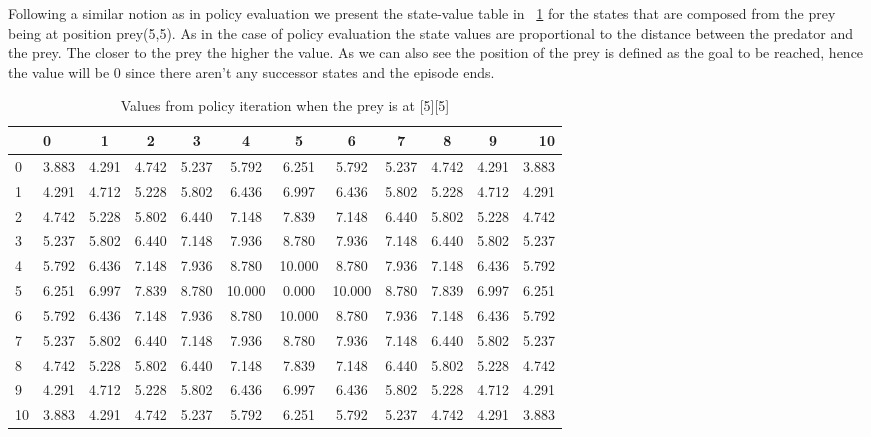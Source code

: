 \documentclass[paper=a4, fontsize=11pt]{scrartcl}
\numberwithin{equation}{section}		%
\numberwithin{figure}{section}			%
\numberwithin{table}{section}				%
\begin{document}
Following a similar notion as in policy evaluation we present the state-value table in ~\ref{pitS} for the states that are composed from the prey being at position prey(5,5). As in the case of policy evaluation the state values are proportional to the distance between the predator and the prey. The closer to the prey the higher the value. As we can also see the position of the prey is defined as the goal to be reached, hence the value will be 0 since there aren't any successor states and the episode ends.

\begin{table}[H]
\caption{Values from policy iteration when the prey is at [5][5]}
\centering
\begin{tabular}{l|l*{9}{c}r}
  \hline
   & 0 & 1 & 2 & 3 & 4 & 5 & 6 & 7 & 8 & 9 & 10 \\ \hline 
0 & 3.883 & 4.291 & 4.742 & 5.237 & 5.792 & 6.251 & 5.792 & 5.237 & 4.742 & 4.291 & 3.883  \\
1 & 4.291 & 4.712 & 5.228 & 5.802 & 6.436 & 6.997 & 6.436 & 5.802 & 5.228 & 4.712 & 4.291  \\
2 & 4.742 & 5.228 & 5.802 & 6.440 & 7.148 & 7.839 & 7.148 & 6.440 & 5.802 & 5.228 & 4.742  \\
3 & 5.237 & 5.802 & 6.440 & 7.148 & 7.936 & 8.780 & 7.936 & 7.148 & 6.440 & 5.802 & 5.237  \\
4 & 5.792 & 6.436 & 7.148 & 7.936 & 8.780 & 10.000 & 8.780 & 7.936 & 7.148 & 6.436 & 5.792  \\
5 & 6.251 & 6.997 & 7.839 & 8.780 & 10.000 & 0.000 & 10.000 & 8.780 & 7.839 & 6.997 & 6.251  \\
6 & 5.792 & 6.436 & 7.148 & 7.936 & 8.780 & 10.000 & 8.780 & 7.936 & 7.148 & 6.436 & 5.792  \\
7 & 5.237 & 5.802 & 6.440 & 7.148 & 7.936 & 8.780 & 7.936 & 7.148 & 6.440 & 5.802 & 5.237  \\
8 & 4.742 & 5.228 & 5.802 & 6.440 & 7.148 & 7.839 & 7.148 & 6.440 & 5.802 & 5.228 & 4.742  \\
9 & 4.291 & 4.712 & 5.228 & 5.802 & 6.436 & 6.997 & 6.436 & 5.802 & 5.228 & 4.712 & 4.291  \\
10&3.883 & 4.291 & 4.742 & 5.237 & 5.792 & 6.251 & 5.792 & 5.237 & 4.742 & 4.291 & 3.883
\end{tabular}
\label{pitS}
\end{table}
\end{document}
